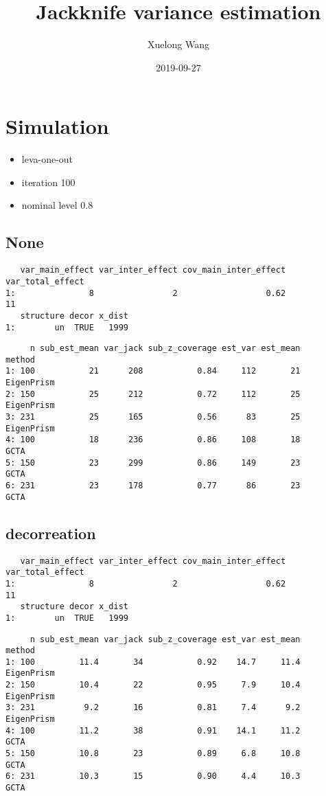 \documentclass[]{article}
\title{Jackknife variance estimation}
\author{Xuelong Wang}
\date{2019-09-27}
\providecommand{\tightlist}{%
  \setlength{\itemsep}{0pt}\setlength{\parskip}{0pt}}
\begin{document}
\maketitle

{
\setcounter{tocdepth}{2}
\tableofcontents
}
\section{Simulation}\label{simulation}

\begin{itemize}
\tightlist
\item
  leva-one-out
\item
  iteration 100
\item
  nominal level 0.8
\end{itemize}

\subsection{None}\label{none}

\begin{verbatim}
   var_main_effect var_inter_effect cov_main_inter_effect var_total_effect
1:               8                2                  0.62               11
   structure decor x_dist
1:        un  TRUE   1999
\end{verbatim}

\begin{verbatim}
     n sub_est_mean var_jack sub_z_coverage est_var est_mean     method
1: 100           21      208           0.84     112       21 EigenPrism
2: 150           25      212           0.72     112       25 EigenPrism
3: 231           25      165           0.56      83       25 EigenPrism
4: 100           18      236           0.86     108       18       GCTA
5: 150           23      299           0.86     149       23       GCTA
6: 231           23      178           0.77      86       23       GCTA
\end{verbatim}

\subsection{decorreation}\label{decorreation}

\begin{verbatim}
   var_main_effect var_inter_effect cov_main_inter_effect var_total_effect
1:               8                2                  0.62               11
   structure decor x_dist
1:        un  TRUE   1999
\end{verbatim}

\begin{verbatim}
     n sub_est_mean var_jack sub_z_coverage est_var est_mean     method
1: 100         11.4       34           0.92    14.7     11.4 EigenPrism
2: 150         10.4       22           0.95     7.9     10.4 EigenPrism
3: 231          9.2       16           0.81     7.4      9.2 EigenPrism
4: 100         11.2       38           0.91    14.1     11.2       GCTA
5: 150         10.8       23           0.89     6.8     10.8       GCTA
6: 231         10.3       15           0.90     4.4     10.3       GCTA
\end{verbatim}
\end{document}
